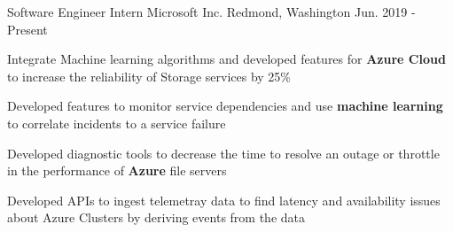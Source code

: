 


\begin{cventries}

\begin{comment}
\cventry
{Software Engineer Intern}
{Microsoft}
{Redmond, Washington}
{Jun. 2018 - Sep. 2018}
{
\begin{cvitems}
\item {Will develop on the frameworks team}
\end{cvitems}
}
\end{comment}

\cventry
	{Software Engineer Intern}
	{Microsoft Inc.}
	{Redmond, Washington}
	{Jun. 2019 - Present}
{								
	\begin{cvitems} 
        \item {Integrate Machine learning algorithms and developed features for \textbf{Azure Cloud} to increase the reliability of Storage services by 25\%}
                \item {Developed features to monitor service dependencies and use \textbf{machine learning} to correlate incidents to a service failure}
                \item {Developed diagnostic tools to decrease the time to resolve an outage or throttle in the performance of \textbf{Azure} file servers}
                \item {Developed APIs to ingest telemetray data to find latency and availability issues about Azure Clusters by deriving events from the data}
	\end{cvitems}
}


\end{cventries}
